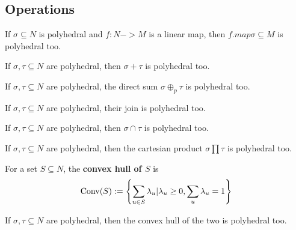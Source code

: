 \subsection{Operations}

\begin{proposition}
  \label{linear-transformation-polyhedral-cone}
  If \( \sigma \subseteq N \) is
  polyhedral and \(f : N -> M\) is a linear map, then \( f.map \sigma \subseteq M \) is polyhedral too.
\end{proposition}

\begin{proposition}
  \label{sum-polyhedral-cone}
  If \( \sigma, \tau \subseteq N \) are
  polyhedral, then \( \sigma + \tau \) is polyhedral too.
\end{proposition}

\begin{proposition}
  \label{direct-sum-polyhedral-cone}
  If \( \sigma, \tau \subseteq N \) are
  polyhedral, the direct sum \( \sigma \oplus_p \tau \) is polyhedral too.
\end{proposition}

\begin{proposition}
  \label{join-polyhedral-cone}
  If \( \sigma, \tau \subseteq N \) are
  polyhedral, their join is polyhedral too.
\end{proposition}

\begin{proposition}
  \label{intersection-polyhedral-cone}
  If \( \sigma, \tau \subseteq N \) are
  polyhedral, then \( \sigma \cap \tau \) is polyhedral too.
\end{proposition}

\begin{proposition}
  \label{product-polyhedral-cone}
  If \( \sigma, \tau \subseteq N \) are
  polyhedral, then the cartesian product \( \sigma \prod \tau \) is polyhedral too.
\end{proposition}


\begin{definition}
  \label{convex-hull}
  \uses{}
  \leanok
  For a set $S \subseteq N$, the {\bf convex hull of $S$} is
  $$\operatorname{Conv}(S) := \left\{\sum_{u \in S} \lambda_u | \lambda_u \ge 0, \sum_u \lambda_u = 1\right\}$$
\end{definition}

\begin{proposition}
  \label{convex-hull-polyhedral-cone}
  If \( \sigma, \tau \subseteq N \) are
  polyhedral, then the convex hull of the two is polyhedral too.
\end{proposition}

